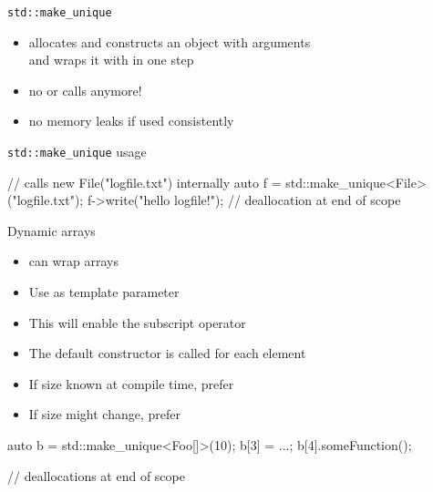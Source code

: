 \begin{frame}[fragile]
  \begin{block}{\texttt{std::make\_unique}}
    \begin{itemize}
      \item allocates and constructs an object with arguments\\
            and wraps it with  in one step
      \item no  or  calls anymore!
      \item no memory leaks if used consistently
    \end{itemize}
  \end{block}
  \pause
  \begin{exampleblock}{\texttt{std::make\_unique} usage}
    \begin{cppcode*}{}
      {
        // calls new File("logfile.txt") internally
        auto f = std::make_unique<File>("logfile.txt");
        f->write("hello logfile!");
      } // deallocation at end of scope
    \end{cppcode*}
  \end{exampleblock}
\end{frame}

\begin{advanced}

\begin{frame}[fragile]
  \begin{block}{Dynamic arrays}
    \begin{itemize}
      \item {} can wrap arrays
      \item Use  as template parameter
      \item This will enable the subscript operator
      \item The default constructor is called for each element
      \item If size known at compile time, prefer 
      \item If size might change, prefer 
    \end{itemize}
  \end{block}
  \begin{exampleblock}{}
    \begin{cppcode*}{}
      auto b = std::make_unique<Foo[]>(10);
      b[3] = ...;
      b[4].someFunction();

      // deallocations at end of scope
    \end{cppcode*}
  \end{exampleblock}
\end{frame}

\end{advanced}

